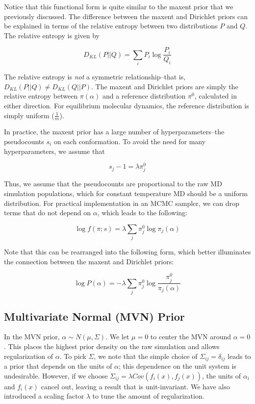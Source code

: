 \documentclass[12pt]{article}
\begin{document}
Notice that this functional form is quite similar to the maxent prior that we previously discussed.  The difference between the maxent and Dirichlet priors can be explained in terms of the relative entropy between two distributions $P$ and $Q$.  The relative entropy is given by

$$D_{KL}(P||Q) = \sum_i P_i \log \frac{P_i}{Q_i}$$

The relative entropy is \emph{not} a symmetric relationship--that is, $D_{KL}(P||Q) \ne D_{KL}(Q||P)$.  The maxent and Dirichlet priors are simply the relative entropy between $\pi(\alpha)$ and a reference distribution $\pi^0$, calculated in either direction.    For equilibrium molecular dynamics, the reference distribution is simply uniform ($\frac{1}{m}$).

In practice, the maxent prior has a large number of hyperparameters--the pseudocounts $s_i$ on each conformation.  To avoid the need for many hyperparameters, we assume that 

$$s_j - 1 = \lambda \pi_j^0$$

Thus, we assume that the pseudocounts are proportional to the raw MD simulation populations, which for constant temperature MD should be a uniform distribution.  For practical implementation in an MCMC sampler, we can drop terms that do not depend on $\alpha$, which leads to the following:

$$\log f(\pi;s) =  \lambda \sum_j \pi_j^0 \log \pi_j(\alpha)$$

Note that this can be rearranged into the following form, which better illuminates the connection between the maxent and Dirichlet priors:

$$\log P(\alpha) = -\lambda \sum_j \pi_j^0 \log \frac{\pi_j^0}{\pi_j(\alpha)}$$


\subsection*{Multivariate Normal (MVN) Prior}

In the MVN prior, $\alpha \sim N(\mu,\Sigma)$.  We let $\mu = 0$ to center the MVN around $\alpha = 0$.  This places the highest prior density on the raw simulation and allows regularization of $\alpha$.  To pick $\Sigma$, we note that the simple choice of $\Sigma_{ij} = \delta_{ij}$ leads to a prior that depends on the units of $\alpha$; this dependence on the unit system is undesirable.  However, if we choose $\Sigma_{ij} = \lambda Cov(f_i(x), f_j(x))$, the units of $\alpha_i$ and $f_i(x)$ cancel out, leaving a result that is unit-invariant.  We have also introduced a scaling factor $\lambda$ to tune the amount of regularization.
\end{document}
